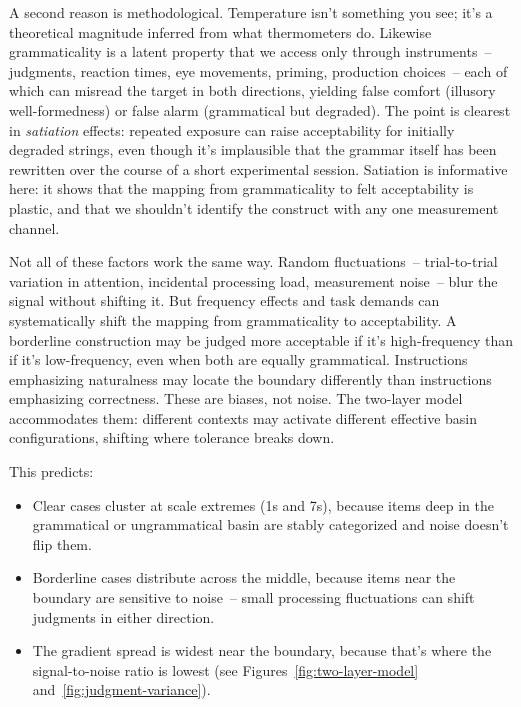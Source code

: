 A second reason is methodological. Temperature isn't something you see; it's a theoretical magnitude inferred from what thermometers do. Likewise grammaticality is a latent property that we access only through instruments~-- judgments, reaction times, eye movements, priming, production choices~-- each of which can misread the target in both directions, yielding false comfort (illusory well-formedness) or false alarm (grammatical but degraded). The point is clearest in \emph{satiation} effects: repeated exposure can raise acceptability for initially degraded strings, even though it's implausible that the grammar itself has been rewritten over the course of a short experimental session. Satiation is informative here: it shows that the mapping from grammaticality to felt acceptability is plastic, and that we shouldn't identify the construct with any one measurement channel.

Not all of these factors work the same way. Random fluctuations~-- trial-to-trial variation in attention, incidental processing load, measurement noise~-- blur the signal without shifting it. But frequency effects and task demands can systematically shift the mapping from grammaticality to acceptability. A borderline construction may be judged more acceptable if it's high-frequency than if it's low-frequency, even when both are equally grammatical. Instructions emphasizing naturalness may locate the boundary differently than instructions emphasizing correctness. These are biases, not noise. The two-layer model accommodates them: different contexts may activate different effective basin configurations, shifting where tolerance breaks down.

This predicts:
\begin{itemize}
\item Clear cases cluster at scale extremes (1s and 7s), because items deep in the grammatical or ungrammatical basin are stably categorized and noise doesn't flip them.
\item Borderline cases distribute across the middle, because items near the boundary are sensitive to noise~-- small processing fluctuations can shift judgments in either direction.
\item The gradient spread is widest near the boundary, because that's where the signal-to-noise ratio is lowest (see Figures~\ref{fig:two-layer-model} and~\ref{fig:judgment-variance}).
\end{itemize}

